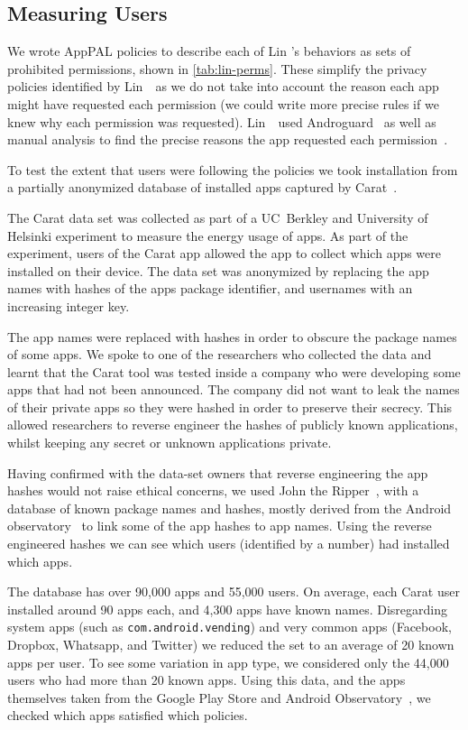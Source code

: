 \documentclass[thesis.tex]{subfiles}
\begin{document}
\subsection{Measuring Users}

We wrote AppPAL policies to describe
each of Lin \etal's behaviors as sets of prohibited permissions, shown in
\autoref{tab:lin-perms}.  These simplify the privacy policies
identified by Lin~\etal~as we do not take into account the reason each
app might have requested each permission (we could write more precise
rules if we knew why each permission was requested).  Lin~\etal~used
Androguard~\cite{andrew_desnos_androguard_2012} as well as manual
analysis to find the precise reasons the app requested each
permission~\cite{lin_modeling_2014}.

To test the extent that users were following the policies we took
installation from a partially anonymized database of installed apps
captured by Carat~\cite{oliner_carat:_2013}.

The Carat data set was collected as part of a UC~Berkley and University
of Helsinki experiment to measure the energy usage of apps.  As part
of the experiment, users of the Carat app allowed the app to collect
which apps were installed on their device.  The data set was anonymized
by replacing the app names with hashes of the apps package identifier,
and usernames with an increasing integer key.

The app names were replaced with hashes in order to obscure the package names
of some apps.  We spoke to one of the researchers who collected the data and
learnt that the Carat tool was tested inside a company who were developing some
apps that had not been announced.  The company did not want to leak the names
of their private apps so they were hashed in order to preserve their secrecy.
This allowed researchers to reverse engineer the hashes of publicly known
applications, whilst keeping any secret or unknown applications private.

Having confirmed with the data-set owners that reverse engineering the app
hashes would not raise ethical concerns, we used John the
Ripper~\cite{solar_designer_john_2013}, with a database of known package names
and hashes, mostly derived from the Android
observatory~\cite{barrera_understanding_2012} to link some of the app hashes to
app names.  Using the reverse engineered hashes we can see which users
(identified by a number) had installed which apps.

The database has over 90,000 apps and 55,000 users.  On average, each
Carat user installed around 90 apps each, and 4,300 apps have known names.
Disregarding system apps (such as \texttt{com.android.vending}) and
very common apps (Facebook, Dropbox, Whatsapp, and Twitter) we reduced
the set to an average of 20 known apps per user.  To see some
variation in app type, we considered only the 44,000 users who had
more than 20 known apps.  Using this data, and the apps themselves
taken from the Google Play Store and Android
Observatory~\cite{barrera_understanding_2012}, we checked which apps
satisfied which policies.
\end{document}
